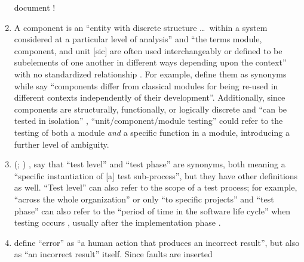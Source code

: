 \begin{enumerate}
          document \citeyearpar[p.~440]{IEEE2017}!
    \item %
          A component is an ``entity with discrete structure \dots\ within a
          system considered at a particular level of analysis''
          \citep{ISO_IEC2023b} and ``the terms module, component, and unit
              [sic] are often used interchangeably or defined to be subelements
          of one another in different ways depending upon the context'' with
          no standardized relationship \citep[p.~82]{IEEE2017}. For example,
          \citetISTQB{} define them as synonyms while
          \citet[p.~107]{BaresiAndPezzè2006} say ``components
          differ from classical modules for being re-used in different contexts
          independently of their development''.
          Additionally, since components are structurally, functionally, or
          logically discrete \citep[p.~419]{IEEE2017} and ``can be tested in
          isolation'' \citepISTQB{}, ``unit/component/module testing'' could
          refer to the testing of both a module \emph{and} a specific function
          in a module, introducing a further level of
          ambiguity.
    \item %
          \citeauthor{IEEE2017} \ifnotpaper
              (\citeyear[pp.~469, 470]{IEEE2017}; \citeyear[p.~9]{IEEE2013}) \else
              \cite[pp.~469, 470]{IEEE2017}, \cite[p.~9]{IEEE2013} \fi say that
          ``test level'' and ``test phase'' are synonyms, both meaning a
          ``specific instantiation of [a] test sub-process'', but they have
          other definitions as well. ``Test level'' can also
          refer to the scope of a test process; for example, ``across the whole
          organization'' or only ``to specific projects''
          \citeyearpar[p.~24]{IEEE2022} and ``test phase'' can also refer to
          the ``period of time in the software life cycle'' when testing occurs
          \citeyearpar[p.~470]{IEEE2017}, usually after the implementation phase
          \citep[pp.~420, 509;][p.~56]{Perry2006}.
    \item %
          \citet[p.~128]{IEEE2010} define
          ``error'' as ``a human action that produces an incorrect result'',
          but also as ``an incorrect result'' itself. Since faults are inserted

\end{enumerate}
